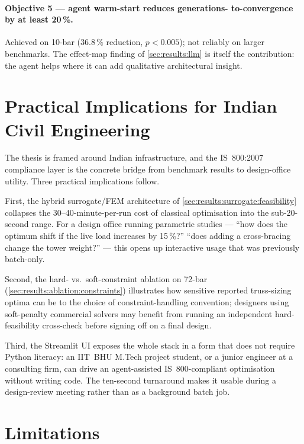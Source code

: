 \paragraph{Objective 5 --- agent warm-start reduces generations-
to-convergence by at least \num{20}\,\%.} Achieved on 10-bar
($\num{36.8}\,\%$ reduction, $p<\num{0.005}$); not reliably on
larger benchmarks. The effect-map finding of
\cref{sec:results:llm} is itself the contribution: the agent
helps where it can add qualitative architectural insight.

\section{Practical Implications for Indian Civil Engineering}
\label{sec:concl:practical}

The thesis is framed around Indian infrastructure, and the
IS~800:2007 compliance layer is the concrete bridge from
benchmark results to design-office utility. Three practical
implications follow.

First, the hybrid surrogate/FEM architecture of
\cref{sec:results:surrogate:feasibility} collapses the
\num{30}--\num{40}-minute-per-run cost of classical
optimisation into the sub-\num{20}-second range. For a design
office running parametric studies --- ``how does the optimum
shift if the live load increases by \num{15}\,\%?''
``does adding a cross-bracing change the tower weight?'' --- this
opens up interactive usage that was previously batch-only.

Second, the hard- vs.\ soft-constraint ablation on 72-bar
(\cref{sec:results:ablation:constraints}) illustrates how
sensitive reported truss-sizing optima can be to the choice of
constraint-handling convention; designers using
soft-penalty commercial solvers may benefit from running an
independent hard-feasibility cross-check before signing off on
a final design.

Third, the Streamlit UI exposes the whole stack in a form that
does not require Python literacy: an IIT~BHU M.Tech project
student, or a junior engineer at a consulting firm, can drive
an agent-assisted IS~800-compliant optimisation without
writing code. The ten-second turnaround makes it usable during
a design-review meeting rather than as a background batch job.

\section{Limitations}
\label{sec:concl:limitations}

